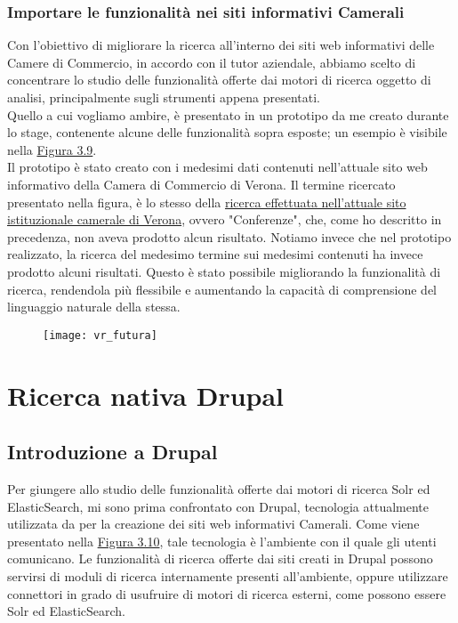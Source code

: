 			\subsubsection{Importare le funzionalità nei siti informativi Camerali}
			Con l'obiettivo di migliorare la ricerca all'interno dei siti web informativi delle Camere di Commercio, in accordo con il tutor aziendale, abbiamo scelto di concentrare lo studio delle funzionalità offerte dai motori di ricerca oggetto di analisi, principalmente sugli strumenti appena presentati. \\
			Quello a cui vogliamo ambire, è presentato in un prototipo da me creato durante lo stage, contenente alcune delle funzionalità sopra esposte; un esempio è visibile nella \hyperref[img:evoluzioneVR]{Figura 3.9}. \\
			Il prototipo è stato creato con i medesimi dati contenuti nell'attuale sito web informativo della Camera di Commercio di Verona. Il termine ricercato presentato nella figura, è lo stesso della \hyperref[img:conferenze]{ricerca effettuata nell'attuale sito istituzionale camerale di Verona}, ovvero "Conferenze", che, come ho descritto in precedenza, non aveva prodotto alcun risultato. Notiamo invece che nel prototipo realizzato, la ricerca del medesimo termine sui medesimi contenuti ha invece prodotto alcuni risultati. Questo è stato possibile migliorando la funzionalità di ricerca, rendendola più flessibile e aumentando la capacità di comprensione del linguaggio naturale della stessa.

			\begin{figure}[htbp]
				\label{img:evoluzioneVR}
				\begin{center}
					\texttt{[image: vr\_futura]}
				\end{center}
			\end{figure}

	\section{Ricerca nativa Drupal}

		\subsection{Introduzione a Drupal}
		Per giungere allo studio delle funzionalità offerte dai motori di ricerca \gls{Solr} ed \gls{ElasticSearch}, mi sono prima confrontato con \gls{Drupal}, tecnologia attualmente utilizzata da \nomeAzienda per la creazione dei siti web informativi Camerali. Come viene presentato nella \hyperref[img:cciaa_drupal]{Figura 3.10}, tale tecnologia è l'ambiente con il quale gli utenti comunicano. Le funzionalità di ricerca offerte dai siti creati in \gls{Drupal} possono servirsi di moduli di ricerca internamente presenti all'ambiente, oppure utilizzare connettori in grado di usufruire di motori di ricerca esterni, come possono essere \gls{Solr} ed \gls{ElasticSearch}.
		
